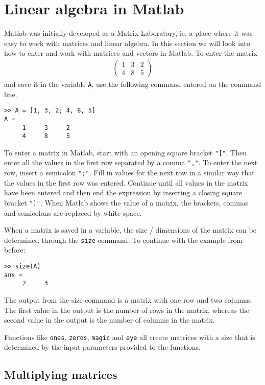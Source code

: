 \section{Linear algebra in Matlab}

Matlab was initially developed as a Matrix Laboratory, ie. a 
place where it was easy to work with matrices and linear algebra.
In this section we will look into how to enter and work with matrices 
and vectors in Matlab.
To enter the matrix 
\begin{align*}
\begin{pmatrix} 1 & 3 & 2 \\ 4 & 8 & 5 \end{pmatrix}
\end{align*}
and save it in the variable \verb!A!, use the following command entered on the 
command line.
\begin{lstlisting}
>> A = [1, 3, 2; 4, 8, 5]
A =
     1     3     2
     4     8     5
\end{lstlisting}
To enter a matrix in Matlab, start with an opening square bracket \verb!"["!.
Then enter all the values in the first row separated by a comma \verb!","!.
To enter the next row, insert a semicolon \verb!";"!.
Fill in values for the next row in a similar way that the values in the first 
row was entered.
Continue until all values in the matrix have been entered and then end
the expression by inserting a closing square bracket \verb!"]"!.
When Matlab shows the value of a matrix, the brackets, commas and 
semicolons are replaced by white space.

When a matrix is saved in a variable, the size / dimensions of the 
matrix can be determined through the \verb!size! command.
To continue with the example from before:
\begin{lstlisting}
>> size(A)
ans =
     2     3
\end{lstlisting}
The output from the size command is a matrix with one row and two columns.
The first value in the output is the number of rows in the matrix, whereas the 
second value in the output is the number of columns in the matrix.

Functions like \verb!ones!, \verb!zeros!, \verb!magic! and \verb!eye! 
all create matrices with a size that is determined by the input 
parameters provided to the functions.


\subsection{Multiplying matrices}

